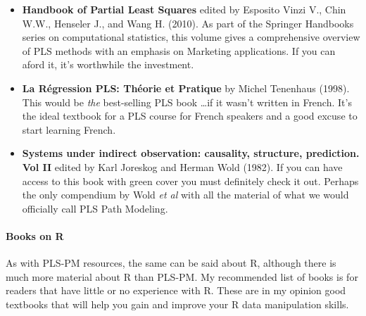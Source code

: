 \documentclass[12pt]{book}\usepackage{graphicx, color}
\begin{document}
\begin{itemize}
 \vspace{2mm}
 \item \textbf{\textsf{Handbook of Partial Least Squares}} edited by Esposito Vinzi V., Chin W.W., Henseler J., and Wang H. (2010). As part of the Springer Handbooks series on computational statistics, this volume gives a comprehensive overview of PLS methods with an emphasis on Marketing applications. If you can aford it, it's worthwhile the investment.
 
 \vspace{2mm}
 \item \textbf{\textsf{La R\'{e}gression PLS: Th\'{e}orie et Pratique}} by Michel Tenenhaus (1998). This would be \textit{the} best-selling PLS book \dots if it wasn't written in French. It's the ideal textbook for a PLS course for French speakers and a good excuse to start learning French.
 
 \vspace{2mm}
 \item \textbf{\textsf{Systems under indirect observation: causality, structure, prediction. Vol II}} edited by Karl Joreskog and Herman Wold (1982). If you can have access to this book with green cover you must definitely check it out. Perhaps the only compendium by Wold \textit{et al} with all the material of what we would officially call PLS Path Modeling.
\end{itemize}


\paragraph{Books on R}
As with PLS-PM resources, the same can be said about R, although there is much more material about R than PLS-PM. My recommended list of books is for readers that have little or no experience with R. These are in my opinion good textbooks that will help you gain and improve your R data manipulation skills.
\end{document}
